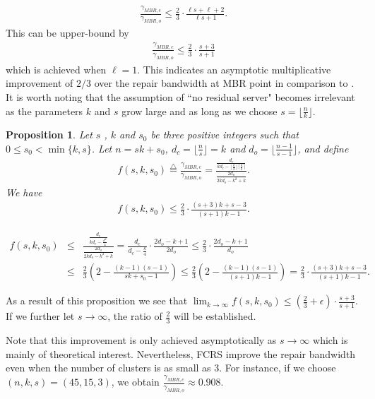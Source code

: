 \documentclass[journal,onecolumn,draftcls]{IEEEtran}
\newtheorem{proposition}{Proposition}
\begin{document}
\begin{eqnarray*}
\frac{\gamma_{MBR,c}}{\gamma_{MBR,o}}  \le \frac{2}{3}\cdot \frac{\ell s + \ell + 2}{\ell s +1}.\end{eqnarray*}
This can be upper-bound by 
\begin{eqnarray*}
\frac{\gamma_{MBR,c}}{\gamma_{MBR,o}}\le \frac{2}{3}\cdot \frac{s + 3}{s + 1}
\end{eqnarray*}
which is achieved when $\ell = 1$. This indicates an asymptotic multiplicative improvement of $2/3$ over the repair bandwidth at MBR point in comparison to \cite{dimakis2010network}. \\
It is worth noting that the assumption of ``no residual server"  becomes irrelevant as the parameters $k$ and $s$ grow large and as long as we choose $s = \lfloor\frac{n}{k}\rfloor$.
\begin{proposition}
Let $s$ , $k$ and $s_0$ be three positive integers such that $0\le s_0<\min\{k,s\}$. Let $n = sk +s_0$, $d_c = \lfloor\frac{n}{s}\rfloor = k$ and $d_o = \lfloor\frac{n-1}{s-1}\rfloor$, and define 
\begin{eqnarray*}
f(s,k,s_0) \stackrel{\triangle}{=}\frac{\gamma_{MBR,c}}{\gamma_{MBR,o}} =  \frac{\frac{d_c}{kd_c - \lfloor\frac{k}{2}\rfloor\lceil\frac{k}{2}\rceil}}{\frac{2d_o}{2kd_o - k^2 + k}}.
\end{eqnarray*}
We have
\begin{eqnarray*}
f(s,k,s_0)\le \frac{2}{3}\cdot \frac{(s+3)k + s -3}{(s+1)k -1}.
\end{eqnarray*}
\end{proposition}
\begin{IEEEproof}
\begin{eqnarray*}
f(s,k,s_0) &\le& \frac{\frac{d_c}{kd_c -\frac{k^2}{4}}}{\frac{2d_o}{2kd_o - k^2 + k}}= \frac{d_c}{d_c - \frac{k}{4}} \cdot \frac{2d_o - k + 1}{2d_o}\le \frac{2}{3}\cdot \frac{2d_o - k + 1}{d_o}\\
&\le& \frac{2}{3}(2 - \frac{(k-1)(s-1)}{sk + s_0 -1})\le  \frac{2}{3}(2 - \frac{(k-1)(s-1)}{(s+1)k  -1}) = \frac{2}{3}\cdot \frac{(s+3)k+s-3}{(s+1)k - 1}.
\end{eqnarray*}
\end{IEEEproof}
As a result of this proposition we see that $\lim_{k\rightarrow \infty} f(s,k,s_0) \le (\frac{2}{3}+\epsilon)\cdot \frac{s+3}{s+1}$. If we further let $s\rightarrow \infty$, the ratio of $\frac{2}{3}$ will be established.

Note that this improvement is only achieved asymptotically as $s\rightarrow \infty$ which is mainly of theoretical interest. Nevertheless, FCRS improve the repair bandwidth even when the number of clusters is as small as 3. For instance, if we choose $(n,k,s) = (45,15,3)$, we obtain $\frac{\gamma_{MBR,c}}{\gamma_{MBR,o}}\approx 0.908$.   
\end{document}
